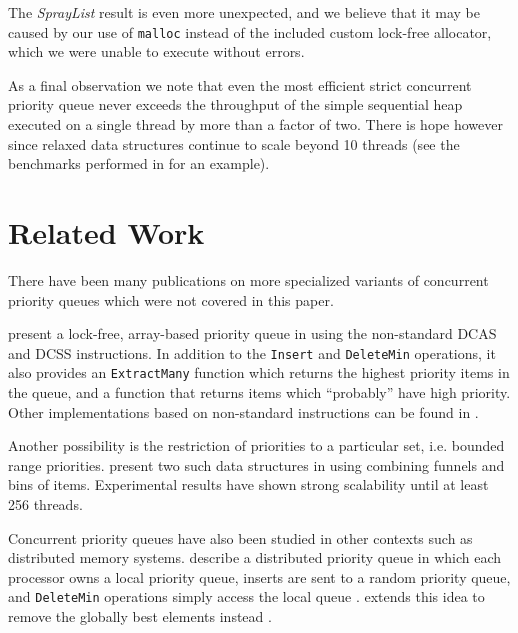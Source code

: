 \documentclass[a4paper,10pt]{article}
\begin{document}
The \textit{SprayList} result is even more unexpected, and we believe that it may be caused by
our use of \lstinline|malloc| instead of the included custom lock-free allocator, which we were
unable to execute without errors.

As a final observation we note that even the most efficient strict concurrent priority queue
never exceeds the throughput of the simple sequential heap executed on a single thread by more
than a factor of two. There is hope however since relaxed data structures continue to scale
beyond 10 threads (see the benchmarks performed in \cite{alistarhspraylist} for an example).

\section{Related Work} \label{sec:related}

There have been many publications on more specialized variants of concurrent priority queues
which were not covered in this paper.



\citeauthor{liu2012lock} present a lock-free, array-based priority queue in \cite{liu2012lock}
using the non-standard \ac{DCAS} and \ac{DCSS} instructions. In addition to the
\lstinline|Insert| and \lstinline|DeleteMin| operations, it also provides an \lstinline|ExtractMany|
function which returns the  highest priority items in the queue, and a function that returns
items which ``probably'' have high priority. Other implementations based on non-standard instructions
can be found in \cite{israeli1993efficient,greenwald1999non}.



Another possibility is the restriction of priorities to a particular set, i.e. bounded range priorities.
\citeauthor{shavit1999scalable} present two such data structures in \cite{shavit1999scalable} using
combining funnels and bins of items. Experimental results have shown strong scalability until at least
256 threads.



Concurrent priority queues have also been studied in other contexts such as distributed memory systems.
\citeauthor{karp1993randomized} describe a distributed priority queue in which each processor owns
a local priority queue, inserts are sent to a random priority queue, and \lstinline|DeleteMin| operations
simply access the local queue \cite{karp1993randomized}.
\citeauthor{sanders1998randomized} extends this idea to remove the globally best elements instead
\cite{sanders1998randomized}.
\end{document}
